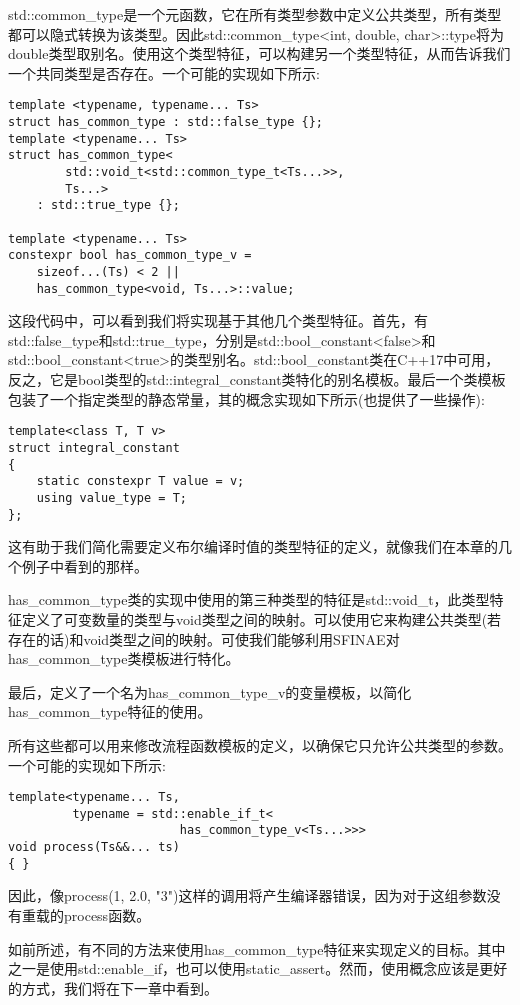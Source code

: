 std::common\_type是一个元函数，它在所有类型参数中定义公共类型，所有类型都可以隐式转换为该类型。因此std::common\_type<int, double, char>::type将为double类型取别名。使用这个类型特征，可以构建另一个类型特征，从而告诉我们一个共同类型是否存在。一个可能的实现如下所示:

\begin{lstlisting}[style=styleCXX]
template <typename, typename... Ts>
struct has_common_type : std::false_type {};
template <typename... Ts>
struct has_common_type<
		std::void_t<std::common_type_t<Ts...>>,
		Ts...>
	: std::true_type {};
	
template <typename... Ts>
constexpr bool has_common_type_v =
	sizeof...(Ts) < 2 ||
	has_common_type<void, Ts...>::value;
\end{lstlisting}

这段代码中，可以看到我们将实现基于其他几个类型特征。首先，有std::false\_type和std::true\_type，分别是std::bool\_constant<false>和std::bool\_constant<true>的类型别名。std::bool\_constant类在C++17中可用，反之，它是bool类型的std::integral\_constant类特化的别名模板。最后一个类模板包装了一个指定类型的静态常量，其的概念实现如下所示(也提供了一些操作):

\begin{lstlisting}[style=styleCXX]
template<class T, T v>
struct integral_constant
{
	static constexpr T value = v;
	using value_type = T;
};
\end{lstlisting}

这有助于我们简化需要定义布尔编译时值的类型特征的定义，就像我们在本章的几个例子中看到的那样。

has\_common\_type类的实现中使用的第三种类型的特征是std::void\_t，此类型特征定义了可变数量的类型与void类型之间的映射。可以使用它来构建公共类型(若存在的话)和void类型之间的映射。可使我们能够利用SFINAE对has\_common\_type类模板进行特化。

最后，定义了一个名为has\_common\_type\_v的变量模板，以简化has\_common\_type特征的使用。

所有这些都可以用来修改流程函数模板的定义，以确保它只允许公共类型的参数。一个可能的实现如下所示:

\begin{lstlisting}[style=styleCXX]
template<typename... Ts,
		 typename = std::enable_if_t<
						has_common_type_v<Ts...>>>
void process(Ts&&... ts)
{ }
\end{lstlisting}

因此，像process(1, 2.0, "3")这样的调用将产生编译器错误，因为对于这组参数没有重载的process函数。

如前所述，有不同的方法来使用has\_common\_type特征来实现定义的目标。其中之一是使用std::enable\_if，也可以使用static\_assert。然而，使用概念应该是更好的方式，我们将在下一章中看到。








